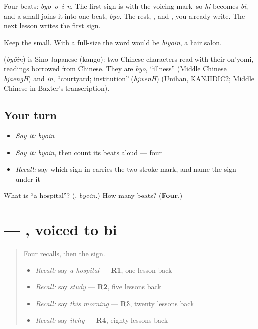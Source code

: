 Four beats: \emph{byo–o–i–n}. The first sign is \textbf{} with the voicing mark, so \emph{hi} becomes \emph{bi}, and a small \textbf{} joins it into one beat, \emph{byo}. The rest, \textbf{}, \textbf{} and \textbf{}, you already write. The next lesson writes the first sign.

Keep the \textbf{} small. With a full-size \textbf{} the word would be \emph{biyōin}, a hair salon.

\begin{cousinweb}
\textbf{} (\emph{byōin}) is Sino-Japanese (kango): two Chinese characters read with their on'yomi, readings borrowed from Chinese. They are \emph{byō}, \textquotedblleft{}illness\textquotedblright{} (Middle Chinese \emph{bjaengH}) and \emph{in}, \textquotedblleft{}courtyard; institution\textquotedblright{} (\emph{hjwenH}) (Unihan, KANJIDIC2; Middle Chinese in Baxter's transcription).
\end{cousinweb}

\subsection*{Your turn}
\begin{itemize}
\raggedright
  \item \emph{Say it:} \emph{byōin}
  \item \emph{Say it:} \emph{byōin}, then count its beats aloud — four
  \item \emph{Recall:} say which sign in \textbf{} carries the two-stroke mark, and name the sign under it
\end{itemize}

\begin{tcolorbox}[breakable,colback=teal!4,colframe=teal!35!black,title={Before you move on}]
What is \textquotedblleft{}a hospital\textquotedblright{}? (\textbf{}, \emph{byōin}.) How many beats? (\textbf{Four}.)
\end{tcolorbox}
\section[\texorpdfstring{\ja{び} (bi)}{び (bi)}]{ — , voiced to bi}

\label{lesson:JA-W135-bi}



\begin{quote}
Four recalls, then the sign.

\begin{itemize}
\raggedright
  \item \emph{Recall:} say \emph{a hospital} — \textbf{R1}, one lesson back
  \item \emph{Recall:} say \emph{study} — \textbf{R2}, five lessons back
  \item \emph{Recall:} say \emph{this morning} — \textbf{R3}, twenty lessons back
  \item \emph{Recall:} say \emph{itchy} — \textbf{R4}, eighty lessons back
\end{itemize}
\end{quote}

